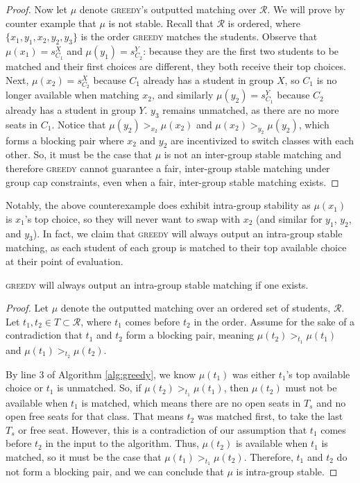 \begin{proof}
  Now let $\mu$ denote \textsc{greedy}'s outputted matching over $\mathcal{R}$.
  We will prove by counter example that $\mu$ is not
  stable. Recall that $\mathcal{R}$ is ordered, where $\{x_1, y_1, x_2, y_2, y_3\}$
  is the order \textsc{greedy} matches the students. Observe that $\mu(x_1) =
  s_{C_1}^X$ and $\mu(y_1) = s_{C_2}^Y$:
  because they are the first two students to be matched and their first choices
  are different, they both receive their top choices. Next, $\mu(x_2) = s_{C_2}^X$
  because $C_1$ already has a student in group $X$, so $C_1$ is no longer
  available when matching $x_2$, and similarly $\mu(y_2) = s_{C_1}^Y$ because
  $C_2$ already has a student in group $Y$. $y_3$ remains unmatched, as there
  are no more seats in $C_1$. Notice that $\mu(y_2) >_{x_2}
  \mu(x_2)$ and $\mu(x_2) >_{y_2} \mu(y_2)$, which forms a blocking pair where
  $x_2$ and $y_2$ are incentivized to switch classes with each other. So, it
  must be the case that $\mu$ is not an inter-group stable matching and
  therefore \textsc{greedy} cannot guarantee a fair, inter-group stable matching
  under group cap constraints, even when a fair, inter-group stable matching exists.
\end{proof}

Notably, the above counterexample does exhibit intra-group stability as
$\mu(x_1)$ is $x_1$'s top choice, so they will never want to swap with $x_2$
(and similar for $y_1$, $y_2$, and $y_3$). In fact, we claim that \textsc{greedy} will
always output an intra-group stable matching, as each student of each group is
matched to their top available choice at their point of evaluation.

\begin{theorem} \label{thm:greedy-intra}
  \textsc{greedy} will always output an intra-group stable matching if one
  exists. 
\end{theorem}

\begin{proof}
  Let $\mu$ denote the outputted matching over an ordered set of
  students, $\mathcal{R}$. Let $t_1, t_2 \in T \subset \mathcal{R}$, where $t_1$ comes
  before $t_2$ in the order.
  Assume for the sake of a contradiction that $t_1$ and $t_2$ form a blocking
  pair, meaning $\mu(t_2) >_{t_1} \mu(t_1)$ and $\mu(t_1) >_{t_2} \mu(t_2)$.

  By line 3 of Algorithm \ref{alg:greedy}, we know $\mu(t_1)$ was either $t_1$'s top
  available choice or $t_1$ is unmatched. So, if $\mu(t_2) >_{t_1} \mu(t_1)$, then
  $\mu(t_2)$ must not be available when $t_1$ is matched, which means there are
  no open seats in $T_s$ and no open free seats for that class. That means $t_2$ was
  matched first, to take the last $T_s$ or free seat. However, this is a
  contradiction of our assumption that $t_1$
  comes before $t_2$ in the input to the algorithm. Thus, $\mu(t_2)$ is available
  when $t_1$ is matched, so it must be the case that $\mu(t_1) >_{t_1} \mu(t_2)$.
  Therefore, $t_1$ and $t_2$ do not form a blocking pair, and we can conclude that
  $\mu$ is intra-group stable.
\end{proof}

